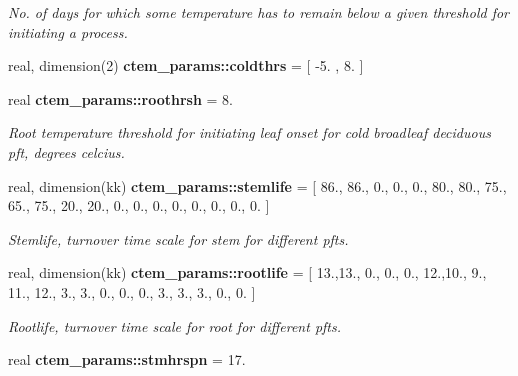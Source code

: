 \begin{DoxyCompactItemize}
\begin{DoxyCompactList}\small\item\em No. of days for which some temperature has to remain below a given threshold for initiating a process. \end{DoxyCompactList}\item 
real, dimension(2) {\bfseries ctem\+\_\+params\+::coldthrs} = \mbox{[} -\/5. , 8. \mbox{]}
\item 
\hypertarget{namespacectem__params_a282fb31f18fec9021b409ebbb0a3882c}{}real {\bfseries ctem\+\_\+params\+::roothrsh} = 8.\label{namespacectem__params_a282fb31f18fec9021b409ebbb0a3882c}

\begin{DoxyCompactList}\small\item\em Root temperature threshold for initiating leaf onset for cold broadleaf deciduous pft, degrees celcius. \end{DoxyCompactList}\item 
\hypertarget{namespacectem__params_abc90906c9c70649408c5ad72dd96ce35}{}real, dimension(kk) {\bfseries ctem\+\_\+params\+::stemlife} = \mbox{[} 86., 86., 0., 0., 0., 80., 80., 75., 65., 75., 20., 20., 0., 0., 0., 0., 0., 0., 0., 0. \mbox{]}\label{namespacectem__params_abc90906c9c70649408c5ad72dd96ce35}

\begin{DoxyCompactList}\small\item\em Stemlife, turnover time scale for stem for different pfts. \end{DoxyCompactList}\item 
\hypertarget{namespacectem__params_ad7b9c1585fd85afce280c21bf6f090c9}{}real, dimension(kk) {\bfseries ctem\+\_\+params\+::rootlife} = \mbox{[} 13.,13., 0., 0., 0., 12.,10., 9., 11., 12., 3., 3., 0., 0., 0., 3., 3., 3., 0., 0. \mbox{]}\label{namespacectem__params_ad7b9c1585fd85afce280c21bf6f090c9}

\begin{DoxyCompactList}\small\item\em Rootlife, turnover time scale for root for different pfts. \end{DoxyCompactList}\item 
\hypertarget{namespacectem__params_ae5c80ee006ea823900274412778709cf}{}real {\bfseries ctem\+\_\+params\+::stmhrspn} = 17.\label{namespacectem__params_ae5c80ee006ea823900274412778709cf}


\end{DoxyCompactItemize}
